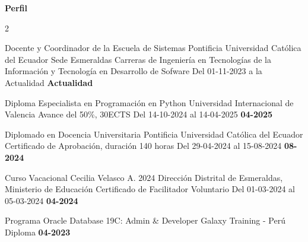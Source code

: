 \newpage
\begin{mainbar}
	\textbf{Perfil}
\end{mainbar}

\setlength{\columnsep}{0.75cm}
\setlength{\columnseprule}{3pt}


\normalsize

\begin{paracol}{2}
\begin{leftcolumn}

\begin{dport}
	\pvevent
	{Docente y Coordinador de la Escuela de Sistemas}
	{Pontificia Universidad Católica del Ecuador Sede Esmeraldas}
	{Carreras de Ingeniería en Tecnologías de la Información y Tecnología en Desarrollo de Sofware}
	{Del 01-11-2023 a la Actualidad}
	{\textbf{Actualidad}}
	
\end{dport}

\begin{dport}
	\pvevent
	{Diploma Especialista en Programación en Python}
	{Universidad Internacional de Valencia}
	{Avance del 50\%, 30ECTS}
	{Del 14-10-2024 al 14-04-2025}
	{\textbf{04-2025}}
\end{dport}

\begin{dport}
	\pvevent
	{Diplomado en Docencia Universitaria}
	{Pontificia Universidad Católica del Ecuador}
	{Certificado de Aprobación, duración 140 horas}
	{Del 29-04-2024 al 15-08-2024}
	{\textbf{08-2024}}
\end{dport}

\begin{lport}
	\pvevent
	{Curso Vacacional Cecilia Velasco A. 2024}
	{Dirección Distrital de Esmeraldas, Ministerio de Educación}
	{Certificado de Facilitador Voluntario}
	{Del 01-03-2024 al 05-03-2024}
	{\textbf{04-2024}}
	
\end{lport}


\begin{dport}
	\pvevent
	{Programa Oracle Database 19C: Admin \& Developer}
	{Galaxy Training - Perú}
	{Diploma}
	{}
	{\textbf{04-2023}}
	
\end{dport}



\end{leftcolumn}


\end{paracol}
